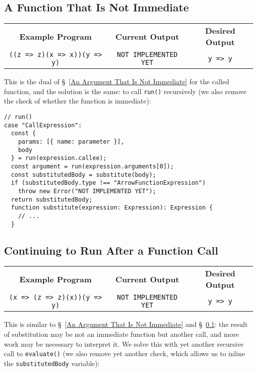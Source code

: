 \documentclass[12pt, oneside]{book}
\begin{document}
\subsection{A Function That Is Not Immediate}
\label{A Function That Is Not Immediate}

\begin{center}
\begin{tabular}{c|c|c}
\textbf{Example Program} & \textbf{Current Output} & \textbf{Desired Output} \\
\texttt{((z => z)(x => x))(y => y)} & \texttt{NOT IMPLEMENTED YET} & \texttt{y => y} \\
\end{tabular}
\end{center}

\noindent This is the dual of §~\ref{An Argument That Is Not Immediate} for the called function, and the solution is the same: to call \texttt{run()} recursively (we also remove the check of whether the function is immediate):

\begin{verbatim}
// run()
case "CallExpression":
  const {
    params: [{ name: parameter }],
    body
  } = run(expression.callee);
  const argument = run(expression.arguments[0]);
  const substitutedBody = substitute(body);
  if (substitutedBody.type !== "ArrowFunctionExpression")
    throw new Error("NOT IMPLEMENTED YET");
  return substitutedBody;
  function substitute(expression: Expression): Expression {
    // ...
  }
\end{verbatim}

\subsection{Continuing to Run After a Function Call}
\label{Continuing to Run After a Function Call}

\begin{center}
\begin{tabular}{c|c|c}
\textbf{Example Program} & \textbf{Current Output} & \textbf{Desired Output} \\
\texttt{(x => (z => z)(x))(y => y)} & \texttt{NOT IMPLEMENTED YET} & \texttt{y => y} \\
\end{tabular}
\end{center}

\noindent This is similar to §~\ref{An Argument That Is Not Immediate} and §~\ref{A Function That Is Not Immediate}: the result of substitution may be not an immediate function but another call, and more work may be necessary to interpret it. We solve this with yet another recursive call to \texttt{evaluate()} (we also remove yet another check, which allows us to inline the \texttt{substitutedBody} variable):
\end{document}
